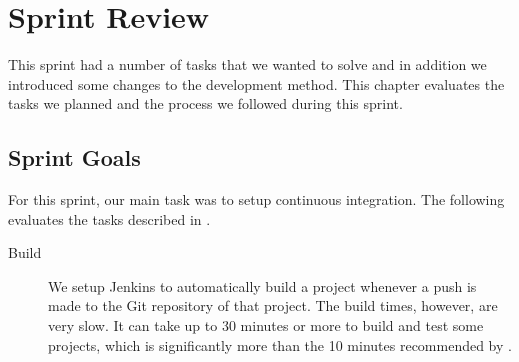 \chapter{Sprint Review}\label{chap:sprint1_end}
This sprint had a number of tasks that we wanted to solve and in addition we introduced some changes to the development method. This chapter evaluates the tasks we planned and the process we followed during this sprint.

\section{Sprint Goals}
For this sprint, our main task was to setup continuous integration. The following evaluates the tasks described in .

\begin{description}
  \item[Build] We setup Jenkins to automatically build a project whenever a push is made to the Git repository of that project. The build times, however, are very slow. It can take up to 30 minutes or more to build and test some projects, which is significantly more than the 10 minutes recommended by \textcite{beck2004}.


\end{description}
